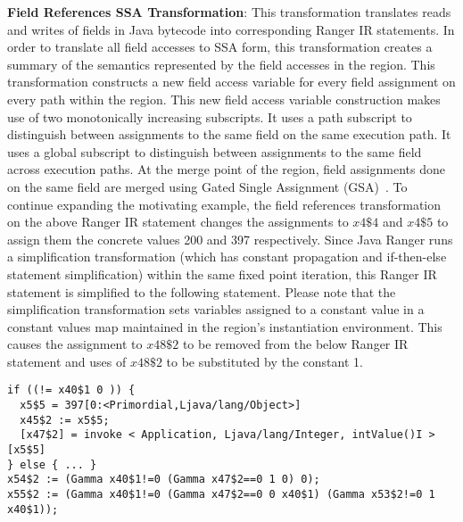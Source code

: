 \textbf{Field References SSA Transformation}: This transformation translates reads and writes of fields
in Java bytecode into corresponding Ranger IR statements.
%
In order to translate all field accesses to SSA form, this transformation creates a summary of the semantics
represented by the field accesses in the region.
%
This transformation constructs a new field access variable for every field assignment on every path within the region.
%
This new field access variable construction makes use of two monotonically increasing subscripts.
%
It uses a path subscript to distinguish between assignments to the same field on the same execution path.
%
It uses a global subscript to distinguish between assignments to the same field across execution paths.
%
At the merge point of the region, field assignments done on the same field are merged using
Gated Single Assignment (GSA)~\cite{Ottenstein1990}.
%
To continue expanding the motivating example, the field references transformation on the above Ranger IR statement
changes the assignments to $x4\$4$ and $x4\$5$ to assign them the concrete values 200 and 397 respectively.
%
Since Java Ranger runs a simplification transformation (which has constant propagation and if-then-else statement
simplification) within the same fixed point iteration, this Ranger IR statement is simplified to the following statement.
%
Please note that the simplification transformation sets variables assigned to a constant value in a constant values
map maintained in the region\rq s instantiation environment.
%
This causes the assignment to $x48\$2$ to be removed from the below Ranger IR statement and uses of $x48\$2$ to be
substituted by the constant 1.
%
\begin{lstlisting}
if ((!= x40$1 0 )) {
  x5$5 = 397[0:<Primordial,Ljava/lang/Object>]
  x45$2 := x5$5;
  [x47$2] = invoke < Application, Ljava/lang/Integer, intValue()I >[x5$5]
} else { ... }
x54$2 := (Gamma x40$1!=0 (Gamma x47$2==0 1 0) 0);
x55$2 := (Gamma x40$1!=0 (Gamma x47$2==0 0 x40$1) (Gamma x53$2!=0 1 x40$1));
\end{lstlisting}

